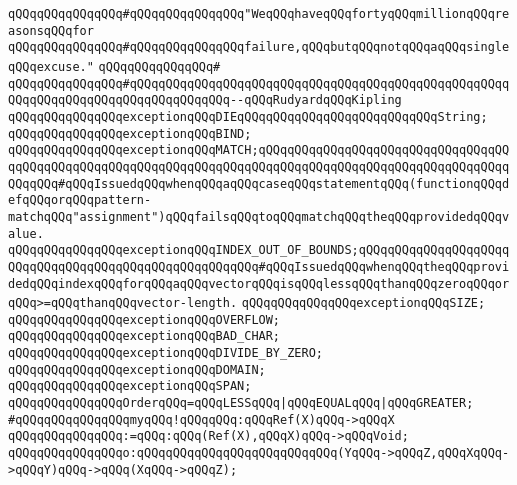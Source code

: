 \verb|qQQqqQQqqQQqqQQq#qQQqqQQqqQQqqQQq"WeqQQqhaveqQQqfortyqQQqmillionqQQqreasonsqQQqfor|\newline
\verb|qQQqqQQqqQQqqQQq#qQQqqQQqqQQqqQQqfailure,qQQqbutqQQqnotqQQqaqQQqsingleqQQqexcuse."|\newline
\verb|qQQqqQQqqQQqqQQq#|\newline
\verb|qQQqqQQqqQQqqQQq#qQQqqQQqqQQqqQQqqQQqqQQqqQQqqQQqqQQqqQQqqQQqqQQqqQQqqQQqqQQqqQQqqQQqqQQqqQQqqQQqqQQq--qQQqRudyardqQQqKipling|\newline
\newline
\verb|qQQqqQQqqQQqqQQqexceptionqQQqDIEqQQqqQQqqQQqqQQqqQQqqQQqqQQqString;|\newline
\newline
\verb|qQQqqQQqqQQqqQQqexceptionqQQqBIND;|\newline
\verb|qQQqqQQqqQQqqQQqexceptionqQQqMATCH;qQQqqQQqqQQqqQQqqQQqqQQqqQQqqQQqqQQqqQQqqQQqqQQqqQQqqQQqqQQqqQQqqQQqqQQqqQQqqQQqqQQqqQQqqQQqqQQqqQQqqQQqqQQqqQQq#qQQqIssuedqQQqwhenqQQqaqQQqcaseqQQqstatementqQQq(functionqQQqdefqQQqorqQQqpattern-matchqQQq"assignment")qQQqfailsqQQqtoqQQqmatchqQQqtheqQQqprovidedqQQqvalue.|\newline
\verb|qQQqqQQqqQQqqQQqexceptionqQQqINDEX_OUT_OF_BOUNDS;qQQqqQQqqQQqqQQqqQQqqQQqqQQqqQQqqQQqqQQqqQQqqQQqqQQqqQQq#qQQqIssuedqQQqwhenqQQqtheqQQqprovidedqQQqindexqQQqforqQQqaqQQqvectorqQQqisqQQqlessqQQqthanqQQqzeroqQQqorqQQq>=qQQqthanqQQqvector-length.|\newline
\verb|qQQqqQQqqQQqqQQqexceptionqQQqSIZE;|\newline
\verb|qQQqqQQqqQQqqQQqexceptionqQQqOVERFLOW;|\newline
\verb|qQQqqQQqqQQqqQQqexceptionqQQqBAD_CHAR;|\newline
\verb|qQQqqQQqqQQqqQQqexceptionqQQqDIVIDE_BY_ZERO;|\newline
\verb|qQQqqQQqqQQqqQQqexceptionqQQqDOMAIN;|\newline
\verb|qQQqqQQqqQQqqQQqexceptionqQQqSPAN;|\newline
\newline
\verb|qQQqqQQqqQQqqQQqOrderqQQq=qQQqLESSqQQq|\verb#|qQQqEQUALqQQq|qQQqGREATER;#\newline
\newline
\verb|#qQQqqQQqqQQqqQQqmyqQQq!qQQqqQQq:qQQqRef(X)qQQq->qQQqX|\newline
\verb|qQQqqQQqqQQqqQQq:=qQQq:qQQq(Ref(X),qQQqX)qQQq->qQQqVoid;|\newline
\newline
\verb|qQQqqQQqqQQqqQQqo:qQQqqQQqqQQqqQQqqQQqqQQqqQQq(YqQQq->qQQqZ,qQQqXqQQq->qQQqY)qQQq->qQQq(XqQQq->qQQqZ);|\newline
